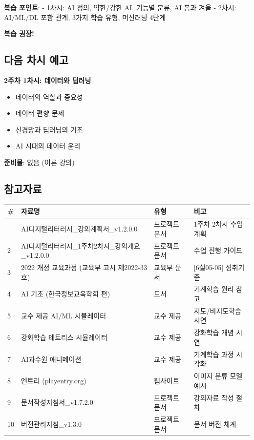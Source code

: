 \documentclass[a4paper, 11pt]{article}
\providecommand{\tightlist}{%
  \setlength{\itemsep}{0pt}\setlength{\parskip}{0pt}}
\begin{document}
\textbf{복습 포인트}: - 1차시: AI 정의, 약한/강한 AI, 기능별 분류, AI
봄과 겨울 - 2차시: AI/ML/DL 포함 관계, 3가지 학습 유형, 머신러닝 4단계

\textbf{복습 권장!}

\hypertarget{uxb2e4uxc74c-uxcc28uxc2dc-uxc608uxace0}{%
\subsection{다음 차시
예고}\label{uxb2e4uxc74c-uxcc28uxc2dc-uxc608uxace0}}

\textbf{2주차 1차시: 데이터와 딥러닝}

\begin{itemize}
\tightlist
\item
  데이터의 역할과 중요성
\item
  데이터 편향 문제
\item
  신경망과 딥러닝의 기초
\item
  AI 시대의 데이터 윤리
\end{itemize}

\textbf{준비물}: 없음 (이론 강의)

\hypertarget{uxcc38uxace0uxc790uxb8cc}{%
\subsection{참고자료}\label{uxcc38uxace0uxc790uxb8cc}}

\begin{longtable}{p{2.5cm}p{3.5cm}p{4.0cm}p{4.0cm}}
\toprule\noalign{}
\textbf{\#} & \textbf{자료명} & \textbf{유형} & \textbf{비고} \\
\midrule\noalign{}
\endhead
\bottomrule\noalign{}
\endlastfoot
1 & AI디지털리터러시\_강의계획서\_v1.2.0.0 & 프로젝트 문서 & 1주차 2차시
수업 계획 \\
2 & AI디지털리터러시\_1주차2차시\_강의개요\_v1.2.0.0 & 프로젝트 문서 &
수업 진행 가이드 \\
3 & 2022 개정 교육과정 (교육부 고시 제2022-33호) & 교육부 문서 &
{[}6실05-05{]} 성취기준 \\
4 & AI 기초 (한국정보교육학회 편) & 도서 & 기계학습 원리 참고 \\
5 & 교수 제공 AI/ML 시뮬레이터 & 교수 제공 & 지도/비지도학습 시연 \\
6 & 강화학습 테트리스 시뮬레이터 & 교수 제공 & 강화학습 개념 시연 \\
7 & AI과수원 애니메이션 & 교수 제공 & 기계학습 과정 시각화 \\
8 & 엔트리 (playentry.org) & 웹사이트 & 이미지 분류 모델 예시 \\
9 & 문서작성지침서\_v1.7.2.0 & 프로젝트 문서 & 강의자료 작성 절차 \\
10 & 버전관리지침\_v1.3.0 & 프로젝트 문서 & 문서 버전 체계 \\
\end{longtable}
\end{document}

